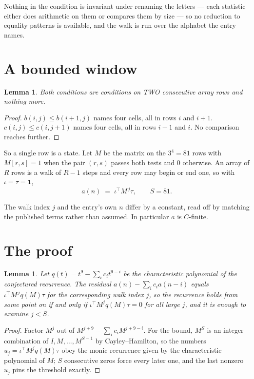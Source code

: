 \documentclass[11pt,a4paper]{article}
\theoremstyle{plain}
\newtheorem{lemma}[theorem]{Lemma}
\theoremstyle{definition}
\begin{document}
Nothing in the condition is invariant under renaming the letters --- each statistic either does
arithmetic on them or compares them by size --- so no reduction to equality patterns is
available, and the walk is run over the alphabet the entry names.

\section{A bounded window}

\begin{lemma}\label{lem:win}
Both conditions are conditions on TWO consecutive array rows and nothing more.
\end{lemma}

\begin{proof}
$b(i,j)\le b(i{+}1,j)$ names four cells, all in rows $i$ and $i+1$. $c(i,j)\le c(i,j{+}1)$
names four cells, all in rows $i-1$ and $i$. No comparison reaches further.
\end{proof}

So a single row is a state. Let $M$ be the matrix on the $3^{4}=81$ rows with
$M[r,s]=1$ when the pair $(r,s)$ passes both tests and $0$ otherwise. An array of $R$ rows is a
walk of $R-1$ steps and every row may begin or end one, so with $\iota=\tau=\mathbf{1}$,
\[
a(n)\;=\;\iota^{\!\top}M^{\,j}\tau ,\qquad S=81.
\]

The walk index $j$ and the entry's own $n$ differ by a constant, read off by matching the
published terms rather than assumed. In particular $a$ is $C$-finite.

\section{The proof}

\begin{lemma}\label{lem:crit}
Let $q(t)=t^{9}-\sum_i c_it^{9-i}$ be the characteristic polynomial of the
conjectured recurrence. The residual $a(n)-\sum_ic_ia(n-i)$ equals
$\iota^{\!\top}M^{\,j}q(M)\tau$ for the corresponding walk index $j$, so the recurrence
holds from some point on if and only if $\iota^{\!\top}M^{j}q(M)\tau=0$ for all large $j$,
and it is enough to examine $j<S$.
\end{lemma}

\begin{proof}
Factor $M^{j}$ out of $M^{j+9}-\sum_ic_iM^{j+9-i}$. For the bound, $M^{S}$
is an integer combination of $I,M,\dots,M^{S-1}$ by Cayley--Hamilton, so the numbers
$u_j=\iota^{\!\top}M^{j}q(M)\tau$ obey the monic recurrence given by the characteristic
polynomial of $M$; $S$ consecutive zeros force every later one, and the last nonzero $u_j$
pins the threshold exactly.
\end{proof}
\end{document}
